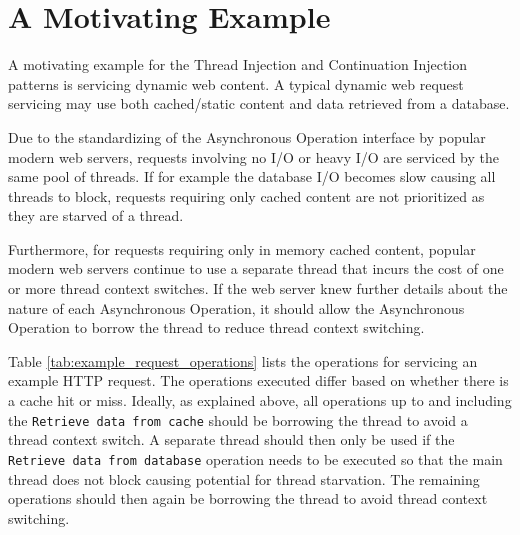 \documentclass[prodmode]{style/acmlarge}
\begin{document}
\section{A Motivating Example}

A motivating example for the Thread Injection and Continuation Injection
patterns is servicing dynamic web content.  A typical dynamic web request
servicing may use both cached/static content and data retrieved from a database.

Due to the standardizing of the Asynchronous Operation interface by popular
modern web servers, requests involving no I/O or heavy I/O are serviced by the
same pool of threads.  If for example the database I/O becomes slow causing all
threads to block, requests requiring only cached content are not prioritized as
they are starved of a thread.

Furthermore, for requests requiring only in memory cached content, popular
modern web servers continue to use a separate thread that incurs the cost of one
or more thread context switches.  If the web server knew further details about
the nature of each Asynchronous Operation, it should allow the Asynchronous
Operation to borrow the thread to reduce thread context switching.

Table \ref{tab:example_request_operations} lists the operations for servicing an
example HTTP request.  The operations executed differ based on whether there is
a cache hit or miss.  Ideally, as explained above, all operations up to and
including the \texttt{Retrieve data from cache} should be borrowing the thread
to avoid a thread context switch.  A separate thread should then only be used if
the \texttt{Retrieve data from database} operation needs to be executed so that
the main thread does not block causing potential for thread starvation.  The
remaining operations should then again be borrowing the thread to avoid thread
context switching.
\end{document}
